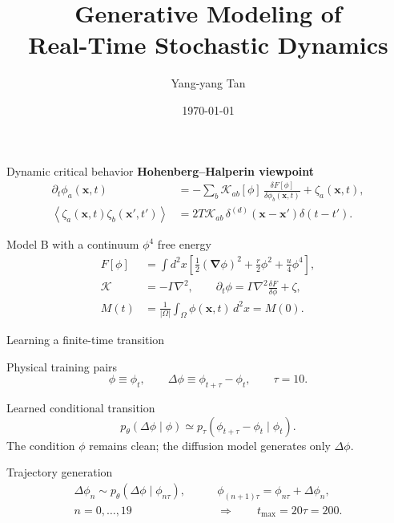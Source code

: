 \documentclass[10pt,UTF8]{beamer}
\title{Generative Modeling of\\[3pt] Real-Time Stochastic Dynamics}
\date{\today}
\author{Yang-yang Tan}
\begin{document}
\maketitle

\begin{frame}{Dynamic critical behavior}
\textbf{Hohenberg--Halperin viewpoint}
\begin{align*}
  \partial_t\phi_a(\mathbf x,t)
  &=-\sum_b\mathcal K_{ab}[\phi]\,
  \frac{\delta F[\phi]}{\delta\phi_b(\mathbf x,t)}
  +\zeta_a(\mathbf x,t),\\
  \left\langle\zeta_a(\mathbf x,t)\zeta_b(\mathbf x',t')\right\rangle
  &=2T\mathcal K_{ab}\,
  \delta^{(d)}(\mathbf x-\mathbf x')\delta(t-t').
\end{align*}

\begin{block}{Model B with a continuum \(\phi^4\) free energy}
\begin{align*}
  F[\phi]
  &=\int d^2x\left[
    \frac{1}{2}(\boldsymbol\nabla\phi)^2
    +\frac{r}{2}\phi^2+\frac{u}{4}\phi^4\right],\\
  \mathcal K&=-\Gamma\nabla^2,
  \qquad
  \partial_t\phi
  =\Gamma\nabla^2\frac{\delta F}{\delta\phi}+\zeta,\\
  M(t)&=\frac{1}{|\Omega|}\int_\Omega\phi(\mathbf x,t)\,d^2x=M(0).
\end{align*}
\end{block}
\end{frame}

\begin{frame}{Learning a finite-time transition}
\begin{block}{Physical training pairs}
\begin{equation*}
  \phi\equiv\phi_t,
  \qquad
  \Delta\phi\equiv\phi_{t+\tau}-\phi_t,
  \qquad
  \tau=10 .
\end{equation*}
\end{block}

\begin{block}{Learned conditional transition}
\begin{equation*}
  p_\theta(\Delta\phi\mid\phi)
  \simeq
  p_\tau(\phi_{t+\tau}-\phi_t\mid\phi_t).
\end{equation*}
The condition \(\phi\) remains clean; the diffusion model generates only
\(\Delta\phi\).
\end{block}

\begin{block}{Trajectory generation}
\begin{align*}
  \Delta\phi_n\sim p_\theta(\Delta\phi\mid\phi_{n\tau}),
  &\qquad
  \phi_{(n+1)\tau}=\phi_{n\tau}+\Delta\phi_n,\\
  n=0,\ldots,19
  &\qquad\Longrightarrow\qquad
  t_{\max}=20\tau=200 .
\end{align*}
\end{block}
\end{frame}
\end{document}

